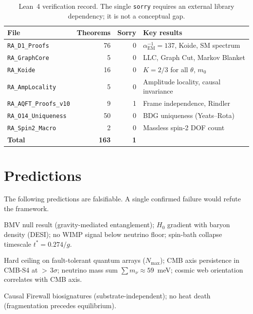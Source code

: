 \documentclass[11pt,a4paper]{article}
\theoremstyle{plain}
\theoremstyle{definition}
\theoremstyle{remark}
\begin{document}
\begin{table}[ht]
\centering\small
\begin{tabular}{@{}lrrl@{}}
\toprule
File & Theorems & Sorry & Key results \\
\midrule
\texttt{RA\_D1\_Proofs}       & 76 & 0 & $\alpha_{\mathrm{EM}}^{-1}=137$, Koide, SM spectrum \\
\texttt{RA\_GraphCore}         &  5 & 0 & LLC, Graph Cut, Markov Blanket \\
\texttt{RA\_Koide}             & 16 & 0 & $K = 2/3$ for all $\theta$, $m_0$ \\
\texttt{RA\_AmpLocality}       &  5 & 0 & Amplitude locality, causal invariance \\
\texttt{RA\_AQFT\_Proofs\_v10} &  9 & 1 & Frame independence, Rindler \\
\texttt{RA\_O14\_Uniqueness}   & 50 & 0 & BDG uniqueness (Yeats--Rota) \\
\texttt{RA\_Spin2\_Macro}      &  2 & 0 & Massless spin-2 DOF count \\
\midrule
\textbf{Total} & \textbf{163} & \textbf{1} & \\
\bottomrule
\end{tabular}
\caption{Lean~4 verification record.  The single \texttt{sorry} requires
an external library dependency; it is not a conceptual gap.}
\label{tab:lean}
\end{table}

\section{Predictions}\label{sec:predictions}

The following predictions are falsifiable.  A single confirmed failure
would refute the framework.

\begin{description}[style=nextline,leftmargin=1.5em,nosep]
\item[Near-term]
  BMV null result (gravity-mediated entanglement);
  $H_0$ gradient with baryon density (DESI);
  no WIMP signal below neutrino floor;
  spin-bath collapse timescale $t^* = 0.274/g$.
\item[Medium-term]
  Hard ceiling on fault-tolerant quantum arrays ($N_{\max}$);
  CMB axis persistence in CMB-S4 at ${>}\,3\sigma$;
  neutrino mass sum $\sum m_\nu \approx 59$~meV;
  cosmic web orientation correlates with CMB axis.
\item[Long-term]
  Causal Firewall biosignatures (substrate-independent);
  no heat death (fragmentation precedes equilibrium).
\end{description}
\end{document}
